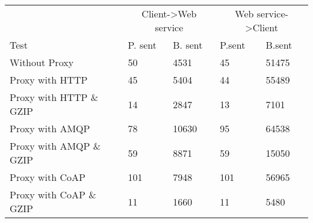 \begin{tabularx}{\textwidth}{lXXXX}
\hline
\multicolumn{1}{l}{}                  & \multicolumn{2}{c}{Client->Web service}                           & \multicolumn{2}{c}{Web service->Client}                           \\
\multicolumn{1}{l}{Test} & \multicolumn{1}{l}{P. sent} & \multicolumn{1}{l}{B. sent} & \multicolumn{1}{l}{P.sent} & \multicolumn{1}{l}{B.sent} \\ \hline
Without Proxy                   & 50             & 4531           & 45             & 51475          \\
Proxy with HTTP                 & 45             & 5404           & 44             & 55489          \\
Proxy with HTTP \& GZIP         & 14             & 2847           & 13             & 7101           \\
Proxy with AMQP                 & 78             & 10630          & 95             & 64538          \\
Proxy with AMQP \& GZIP         & 59             & 8871           & 59             & 15050          \\
Proxy with CoAP                 & 101            & 7948           & 101            & 56965          \\
Proxy with CoAP \& GZIP         & 11             & 1660           & 11             & 5480           \\
\end{tabularx}
